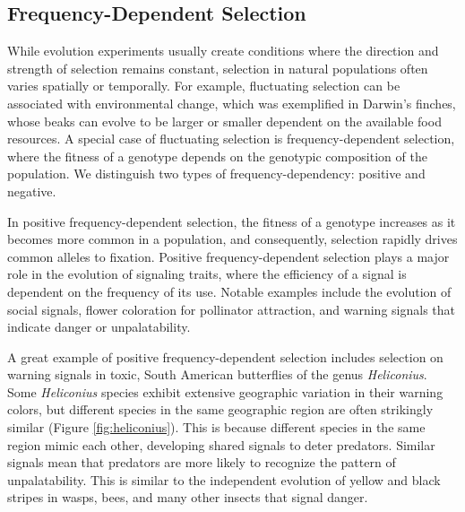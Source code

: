 \documentclass[
]{book}
\begin{document}
\hypertarget{frequency-dependent-selection}{%
\subsection{Frequency-Dependent Selection}\label{frequency-dependent-selection}}

While evolution experiments usually create conditions where the direction and strength of selection remains constant, selection in natural populations often varies spatially or temporally. For example, fluctuating selection can be associated with environmental change, which was exemplified in Darwin's finches, whose beaks can evolve to be larger or smaller dependent on the available food resources. A special case of fluctuating selection is frequency-dependent selection, where the fitness of a genotype depends on the genotypic composition of the population. We distinguish two types of frequency-dependency: positive and negative.

In positive frequency-dependent selection, the fitness of a genotype increases as it becomes more common in a population, and consequently, selection rapidly drives common alleles to fixation. Positive frequency-dependent selection plays a major role in the evolution of signaling traits, where the efficiency of a signal is dependent on the frequency of its use. Notable examples include the evolution of social signals, flower coloration for pollinator attraction, and warning signals that indicate danger or unpalatability.

A great example of positive frequency-dependent selection includes selection on warning signals in toxic, South American butterflies of the genus \emph{Heliconius}. Some \emph{Heliconius} species exhibit extensive geographic variation in their warning colors, but different species in the same geographic region are often strikingly similar (Figure \ref{fig:heliconius}). This is because different species in the same region mimic each other, developing shared signals to deter predators. Similar signals mean that predators are more likely to recognize the pattern of unpalatability. This is similar to the independent evolution of yellow and black stripes in wasps, bees, and many other insects that signal danger.
\end{document}
